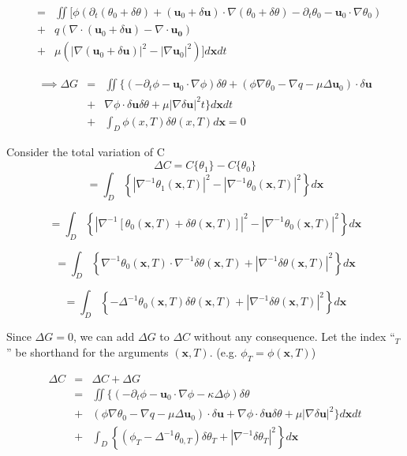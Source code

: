 \begin{flushleft}
  \begin{eqnarray*}
 	 &=& \iint [
  		\phi\left(
  			\partial_{t}(\theta_{0}+\delta\theta)+(\mathbf{u}_{0}+\delta\mathbf{u})\cdot \nabla(\theta_{0}+\delta\theta)
  			-\partial_{t}\theta_{0}-\mathbf{u}_{0}\cdot \nabla 					\theta_{0}
	  	\right) \\
	&+& q\left(
		\nabla\cdot(\mathbf{u}_{0}+\delta\mathbf{u})-\nabla\cdot\mathbf{u_{0}}	
	  	\right) \\
	&+&\mu \left( 
		 	 |\nabla(\mathbf{u}_{0}+\delta\mathbf{u})|^{2}- |\nabla \mathbf{u}_{0}|^{2}
	  	\right)
  ]d\mathbf{x}dt
\end{eqnarray*}

  \begin{eqnarray*}
 	\implies \Delta G &=& \iint \{
  		(-\partial_{t}\phi-\mathbf{u}_{0}\cdot\nabla\phi)\delta\theta
		+( \phi \nabla\theta_{0} - \nabla q -\mu \Delta \mathbf{u}_{0})\cdot \delta\mathbf{u} \\
		 &+&\nabla\phi\cdot\delta\mathbf{u}\delta \theta 
		 +\mu |\nabla\delta \mathbf{u}|^{2}  
  		t\}d\mathbf{x}dt \\
  &+& \int_{D}\phi(x,T)\delta\theta(x,T)d\mathbf{x} = 0
\end{eqnarray*}
 
  
 
  Consider the total variation of C
 \[ \Delta C= C\{\theta_{1}\}-C\{\theta_{0}\} \] 
 \[=\int_{D}\left\{ |\nabla^{-1}\theta_{1}(\mathbf{x},T)|^{2} - |\nabla^{-1} \theta_{0}(\mathbf{x},T)|^{2} \right\} d\mathbf{x} \]
 
\[=\int_{D}\left\{ 
  			|\nabla^{-1} \left[
  				\theta_{0}(\mathbf{x},T)+\delta\theta(\mathbf{x},T)											\right]|^{2} 
  			- |\nabla^{-1} \theta_{0}(\mathbf{x},T)|^{2} 
  		\right\} 
d\mathbf{x} \]
  
\[
	=\int_{D}
	\left\{ 
   		\nabla^{-1}\theta_{0}(\mathbf{x},T)\cdot
   		\nabla^{-1} \delta\theta(\mathbf{x},T)
   		+|\nabla^{-1} 
		\delta\theta(\mathbf{x},T)|^{2} 
   \right\} 
   d\mathbf{x}  
\]
 
\[
	=\int_{D}
	\left\{ 
   		-\Delta^{-1}\theta_{0}(\mathbf{x},T)\delta\theta(\mathbf{x},T)
   		+|\nabla^{-1} 
		\delta\theta(\mathbf{x},T)|^{2} 
   \right\} 
   d\mathbf{x}  
\]
 
Since $\Delta G=0$, we can add  $\Delta G$ to $\Delta C$ without any consequence. Let the index ``$_{T}$'' be shorthand for the arguments $(\mathbf{x},T)$. (e.g. $\phi_{T}=\phi(\mathbf{x},T)$)


  \begin{eqnarray*}
 	\Delta C&=& \Delta C+\Delta G \\
 	         &=& \iint \{
  			(-\partial_{t}\phi-\mathbf{u}_{0}\cdot\nabla\phi -\kappa \Delta \phi)\delta\theta \\
			&+&( \phi \nabla\theta_{0} - \nabla q -\mu \Delta \mathbf{u}_{0})\cdot \delta\mathbf{u}
			 +\nabla\phi\cdot\delta\mathbf{u}\delta \theta 
			 +\mu |\nabla\delta \mathbf{u}|^{2}  
  		\}d\mathbf{x}dt \\
		  &+& \int_{D}\left\{
  			(\phi_{T}-\Delta^{-1}\theta_{0,T})\delta\theta_{T}
   			+|\nabla^{-1} 
			\delta\theta_{T}|^{2}
	       \right\} d\mathbf{x}		
\end{eqnarray*}
 

\end{flushleft}
